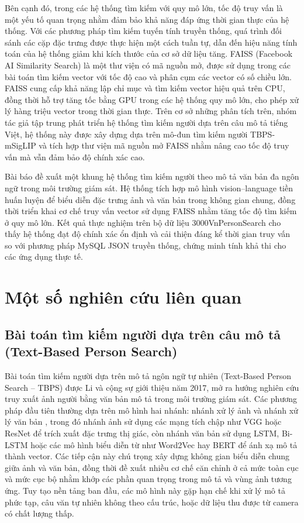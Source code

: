 \documentclass{jstarticle}
\begin{document}
Bên cạnh đó, trong các hệ thống tìm kiếm với quy mô lớn, tốc độ truy vấn là một yếu tố quan trọng nhằm đảm bảo khả năng đáp ứng thời gian thực của hệ thống. Với các phương pháp tìm kiếm tuyến tính truyền thống, quá trình đối sánh các cặp đặc trưng được thực hiện một cách tuần tự, dẫn đến hiệu năng tính toán của hệ thống giảm khi kích thước của cơ sở dữ liệu tăng. FAISS (Facebook AI Similarity Search) \cite{douze2025faiss} là một thư viện có mã nguồn mở, được sử dụng trong các bài toán tìm kiếm vector với tốc độ cao và phân cụm các vector có số chiều lớn. FAISS cung cấp khả năng lập chỉ mục và tìm kiếm vector hiệu quả trên CPU, đồng thời hỗ trợ tăng tốc bằng GPU trong các hệ thống quy mô lớn, cho phép xử lý hàng triệu vector trong thời gian thực. Trên cơ sở những phân tích trên, nhóm tác giả tập trung phát triển hệ thống tìm kiếm người dựa trên câu mô tả tiếng Việt, hệ thống này được xây dựng dựa trên mô-đun tìm kiếm người TBPS-mSigLIP \cite{tran2025multilingual} và tích hợp thư viện mã nguồn mở FAISS nhằm nâng cao tốc độ truy vấn mà vẫn đảm bảo độ chính xác cao.

Bài báo đề xuất một khung hệ thống tìm kiếm người theo mô tả văn bản đa ngôn ngữ trong môi trường giám sát. Hệ thống tích hợp mô hình vision–language tiền huấn luyện để biểu diễn đặc trưng ảnh và văn bản trong không gian chung, đồng thời triển khai cơ chế truy vấn vector sử dụng FAISS nhằm tăng tốc độ tìm kiếm ở quy mô lớn. Kết quả thực nghiệm trên bộ dữ liệu 3000VnPersonSearch cho thấy hệ thống đạt độ chính xác ổn định và cải thiện đáng kể thời gian truy vấn so với phương pháp MySQL JSON truyền thống, chứng minh tính khả thi cho các ứng dụng thực tế.

\section{Một số nghiên cứu liên quan}
\subsection{Bài toán tìm kiếm người dựa trên câu mô tả (Text-Based Person Search)}

Bài toán tìm kiếm người dựa trên mô tả ngôn ngữ tự nhiên (Text-Based Person Search – TBPS) được Li và cộng sự giới thiệu năm 2017\cite{Li_2017_CVPR}, mở ra hướng nghiên cứu truy xuất ảnh người bằng văn bản mô tả trong môi trường giám sát. Các phương pháp đầu tiên thường dựa trên mô hình hai nhánh: nhánh xử lý ảnh và nhánh xử lý văn bản \cite{jing2020pose, wang2020vitaa, jing2020cross,suo2022simple, zhou2023text, niu2023improving}, trong đó nhánh ảnh sử dụng các mạng tích chập như VGG hoặc ResNet để trích xuất đặc trưng thị giác, còn nhánh văn bản sử dụng LSTM, Bi-LSTM hoặc các mô hình biểu diễn từ như Word2Vec hay BERT để ánh xạ mô tả thành vector. Các tiếp cận này chú trọng xây dựng không gian biểu diễn chung giữa ảnh và văn bản, đồng thời đề xuất nhiều cơ chế căn chỉnh ở cả mức toàn cục và mức cục bộ nhằm khớp các phần quan trọng trong mô tả và vùng ảnh tương ứng. Tuy tạo nền tảng ban đầu, các mô hình này gặp hạn chế khi xử lý mô tả phức tạp, câu văn tự nhiên không theo cấu trúc, hoặc dữ liệu thu được từ camera có chất lượng thấp.
\end{document}
